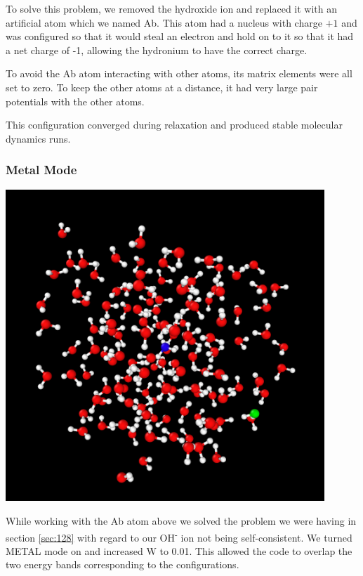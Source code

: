 \documentclass{article}
\newenvironment{Figure}{\par\medskip\noindent\minipage{\linewidth}}{\endminipage\par\medskip}
\begin{document}
\begin{multicols}{2}
To solve this problem, we removed the hydroxide ion and replaced it with an artificial atom which we named Ab. This atom had a nucleus with charge $+1$ and was configured so that it would steal an electron and hold on to it so that it had a net charge of -1, allowing the hydronium to have the correct charge. 

To avoid the Ab atom interacting with other atoms, its matrix elements were all set to zero. To keep the other atoms at a distance, it had very large pair potentials with the other atoms.

This configuration converged during relaxation and produced stable molecular dynamics runs.

\subsubsection{Metal Mode}
\label{sec:metal}
\begin{Figure}
	\centering
	\includegraphics[width=0.9\textwidth]{figures/128}
	\label{fig:128}	
\end{Figure}

While working with the Ab atom above we solved the problem we were having in section \ref{sec:128} with regard to our OH\textsuperscript{-} ion not being self-consistent. We turned METAL mode on and increased W to 0.01. This allowed the code to overlap the two energy bands corresponding to the configurations. 
 

\end{multicols}
\end{document}

